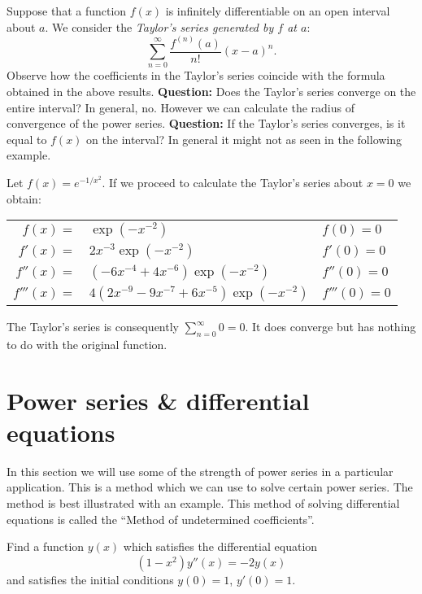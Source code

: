 Suppose that a function \(f(x)\) is infinitely differentiable on an open interval about \(a\).
We consider the \emph{Taylor's series generated by \(f\) at \(a\)}:
\[
  \sum_{n=0}^{\infty} \frac{f^{(n)}(a)}{n!} {(x-a)}^{n}.
\]
Observe how the coefficients in the Taylor's series coincide with the formula obtained in the above results.
\textbf{Question:}
Does the Taylor's series converge on the entire interval?
In general, no. However we can calculate the radius of convergence of the power series.
\textbf{Question:}
If the Taylor's series converges, is it equal to \(f(x)\) on the interval?
{In general it might not as seen in the following example.}

\begin{example*}
  Let  \(f(x) = e^{-1/x^2}\).
  If we proceed to calculate the Taylor's series about \(x=0\) we obtain:

  \begin{tabular}{ r l  l}
    \(f(x) = \)  & \( \exp(-x^{-2})\)
                 & \(f(0)=0\)                                          \\
    \(f'(x)=\)   & \( 2x^{-3} \exp(-x^{-2})\)
                 & \(f'(0)=0\)                                         \\
    \(f''(x)=\)  & \( (-6 x^{-4}   + 4x^{-6} )\exp(-x^{-2})  \)
                 & \(f''(0)=0\)                                        \\
    \(f'''(x)=\) & \( 4 (2x^{-9} - 9 x^{-7} + 6 x^{-5})\exp(-x^{-2})\) %
                 & \(f'''(0)=0\)                                       %
  \end{tabular}

  \noindent
  The Taylor's series is consequently \(\sum_{n=0}^{\infty} 0 = 0\).
  It does converge but has nothing to do with the original function.
\end{example*}

\section{Power series \& differential equations}

In this section we will use some of the strength of power series in a particular application. This is a method which we can use to solve certain power series. The method is best illustrated with an example.
This method of solving differential equations is called the ``Method of undetermined coefficients''.

\begin{task}
  Find a function \(y(x)\) which satisfies the differential equation
  \[
    (1-x^2)y''(x) = -2y(x)
  \]
  and satisfies the initial conditions \(y(0)=1\), \(y'(0)=1\).
\end{task}

